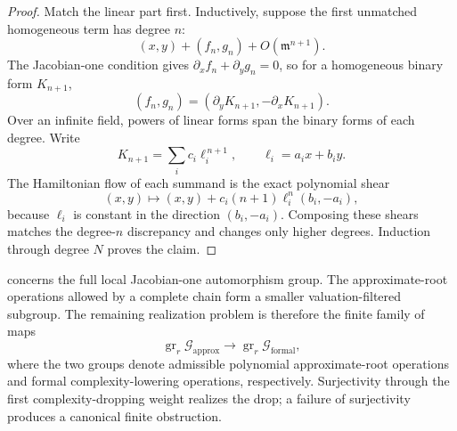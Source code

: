 \begin{proof}
Match the linear part first.  Inductively, suppose the first unmatched
homogeneous term has degree \(n\):
\[
(x,y)+(f_n,g_n)+O(\mathfrak m^{n+1}).
\]
The Jacobian-one condition gives
\(\partial_xf_n+\partial_yg_n=0\), so for a homogeneous binary form
\(K_{n+1}\),
\[
(f_n,g_n)=(\partial_yK_{n+1},-\partial_xK_{n+1}).
\]
Over an infinite field, powers of linear forms span the binary forms of
each degree.  Write
\[
K_{n+1}=\sum_i c_i\ell_i^{\,n+1},
\qquad \ell_i=a_ix+b_iy.
\]
The Hamiltonian flow of each summand is the exact polynomial shear
\[
(x,y)\longmapsto
(x,y)+c_i(n+1)\ell_i^n(b_i,-a_i),
\]
because \(\ell_i\) is constant in the direction \((b_i,-a_i)\).  Composing
these shears matches the degree-\(n\) discrepancy and changes only higher
degrees.  Induction through degree \(N\) proves the claim.
\end{proof}

\begin{question}
\label{q:filtered-finite-jet-realization}
 concerns the full local
Jacobian-one automorphism group.  The approximate-root operations allowed
by a complete chain form a smaller valuation-filtered subgroup.  The
remaining realization problem is therefore the finite family of maps
\[
\operatorname{gr}_r\mathcal G_{\mathrm{approx}}
\longrightarrow
\operatorname{gr}_r\mathcal G_{\mathrm{formal}},
\]
where the two groups denote admissible polynomial approximate-root
operations and formal complexity-lowering operations, respectively.
Surjectivity through the first complexity-dropping weight realizes the
drop; a failure of surjectivity produces a canonical finite obstruction.
\end{question}
